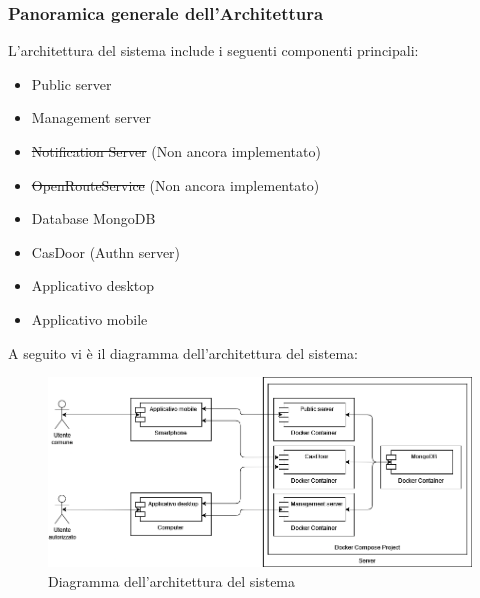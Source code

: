 \documentclass{article}
\begin{document}
\subsubsection{Panoramica generale dell'Architettura}
L'architettura del sistema include i seguenti componenti principali:
\begin{itemize}
    \item Public server
    \item Management server
    \item \st{Notification Server} (Non ancora implementato)
    \item \st{OpenRouteService} (Non ancora implementato)
    \item Database MongoDB
    \item CasDoor (Authn server)
    \item Applicativo desktop
    \item Applicativo mobile
\end{itemize}

A seguito vi è il diagramma dell'architettura del sistema:

\clearpage

\begin{figure}[H]
    \centering
    \includegraphics[width=1\textwidth]{Images/Component.png}
    \caption{Diagramma dell'architettura del sistema}
    \label{fig:architettura}
\end{figure}
\end{document}
